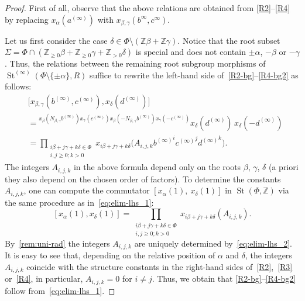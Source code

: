 \documentclass[oneside, 11pt]{amsart}
\numberwithin{equation}{section}
\theoremstyle{definition}
\theoremstyle{remark}
\DeclareMathOperator\St{St}
\newcommand{\ZZ}{\mathbb{Z}}
\newcommand{\up}[2]{{^{#1}\!{#2}}}
\begin{document}
\begin{proof}
 First of all, observe that the above relations are obtained from \eqref{R2}--\eqref{R4} by replacing $x_\alpha(a^{(\infty)})$ with $x_{\beta, \gamma}(b^{\infty}, c^{\infty})$.
 
 Let us first consider the case \(\delta \in \Phi \setminus (\ZZ \beta + \ZZ \gamma)\).
 Notice that the root subset $\Sigma = \Phi \cap (\ZZ_{\geq 0}\beta + \ZZ_{\geq 0}\gamma + \ZZ_{>0}\delta)$ is special and does not contain $\pm\alpha$, $-\beta$ or $-\gamma$. Thus, the relations between the remaining root subgroup morphisms of $\St^{(\infty)}(\Phi\setminus\{\pm\alpha\}, R)$ suffice to rewrite the left-hand side of~\eqref{R2-bg}--\eqref{R4-bg2} as follows:
 \begin{align}
  &\bigl[x_{\beta, \gamma}(b^{(\infty)}, c^{(\infty)}), x_\delta(d^{(\infty)})\bigr] \label{eq:elim-lhs_1} \\
  &= \up{x_\beta(N_{\beta, \gamma} b^{(\infty)})
   x_\gamma(c^{(\infty)})
   x_\beta(-N_{\beta, \gamma} b^{(\infty)})
   x_\gamma(-c^{(\infty)})}
  {x_\delta(d^{(\infty)})}\,
  x_\delta(-d^{(\infty)}) \nonumber \\
  &= \prod_{\substack{i\beta + j\gamma + k\delta \in \Phi\\ i, j \geq 0; k > 0}}
  x_{i\beta + j\gamma + k\delta} \bigl(A_{i, j, k} {b^{(\infty)}}^i {c^{(\infty)}}^j {d^{(\infty)}}^k\bigr). \nonumber
 \end{align}
 The integers \(A_{i, j, k}\) in the above formula depend only on the roots \(\beta\), \(\gamma\), \(\delta\) (a priori they also depend on the chosen order of factors). To determine the constants $A_{i,j,k}$, one can compute the commutator $[x_\alpha(1),\ x_\delta(1)]$ in $\St(\Phi, \ZZ)$ via the same procedure as in~\eqref{eq:elim-lhs_1}:
 \begin{equation} \label{eq:elim-lhs_2}
  [x_\alpha(1), x_\delta(1)] = \prod_{\substack{i\beta + j\gamma + k\delta \in \Phi\\ i, j \geq 0; k > 0}}
  x_{i\beta + j\gamma + k\delta}(A_{i, j, k}).
 \end{equation}
  By~\cref{rem:uni-rad} the integers $A_{i,j,k}$ are uniquely determined by~\eqref{eq:elim-lhs_2}.
  It is easy to see that, depending on the relative position of $\alpha$ and $\delta$, the integers $A_{i,j,k}$ coincide with the structure constants in the right-hand sides of~\eqref{R2},~\eqref{R3} or~\eqref{R4}, in particular, $A_{i,j,k}=0$ for $i\neq j$.
  Thus, we obtain that \eqref{R2-bg}--\eqref{R4-bg2} follow from~\eqref{eq:elim-lhs_1}.
 

\end{proof}
\end{document}
